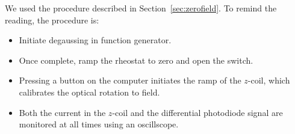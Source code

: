    
  

We used the procedure described in Section~\ref{sec:zerofield}.  To
remind the reading, the procedure is:
\begin{itemize}
\item Initiate degaussing in function generator.
\item Once complete, ramp the rheostat to zero and open the switch.
\item Pressing a button on the computer initiates the ramp of the
  $z$-coil, which calibrates the optical rotation to field.
\item Both the current in the $z$-coil and the differential photodiode
  signal are monitored at all times using an oscillscope.
\end{itemize}


